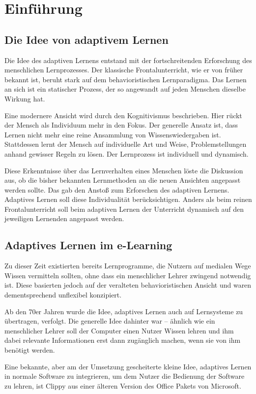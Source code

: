 \chapter{Einführung}

\section{Die Idee von adaptivem Lernen}
Die Idee des adaptiven Lernens entstand mit der fortschreitenden
Erforschung des menschlichen Lernprozesses.
Der klassische Frontalunterricht, wie er von früher bekannt ist,
beruht stark auf dem behavioristischen Lernparadigma.
Das Lernen an sich ist ein statischer Prozess, der so angewandt
auf jeden Menschen dieselbe Wirkung hat.

Eine modernere Ansicht wird durch den Kognitivismus
beschrieben. Hier rückt der Mensch als Individuum mehr in den Fokus.
Der generelle Ansatz ist, dass Lernen nicht mehr eine reine
Ansammlung von Wissenswiedergaben ist. Stattdessen lernt der Mensch
auf individuelle Art und Weise, Problemstellungen anhand gewisser Regeln zu lösen.
Der Lernprozess ist individuell und dynamisch.

Diese Erkenntnisse über das Lernverhalten eines Menschen löste die Diskussion aus,
ob die bisher bekannten Lernmethoden an die neuen Ansichten angepasst werden sollte.
Das gab den Anstoß zum Erforschen des adaptiven Lernens.
Adaptives Lernen soll diese Individualität berücksichtigen.
Anders als beim reinen Frontalunterricht soll beim adaptiven Lernen
der Unterricht dynamisch auf den jeweiligen Lernenden angepasst werden.

\section{Adaptives Lernen im e-Learning}
Zu dieser Zeit existierten bereits Lernprogramme, die Nutzern
auf medialen Wege Wissen vermitteln sollten, ohne dass ein menschlicher Lehrer
zwingend notwendig ist. Diese basierten jedoch auf der veralteten behavioristischen
Ansicht und waren dementsprechend unflexibel konzipiert.

Ab den 70er Jahren wurde die Idee, adaptives Lernen auch auf Lernsysteme
zu übertragen, verfolgt. Die generelle Idee dahinter war -- ähnlich wie ein
menschlicher Lehrer soll der Computer einen Nutzer Wissen lehren und
ihm dabei relevante Informationen erst dann zugänglich machen, wenn sie von ihm
benötigt werden.

Eine bekannte, aber am der Umsetzung gescheiterte kleine Idee, adaptives Lernen
in normale Software zu integrieren, um dem Nutzer die Bedienung der Software zu lehren,
ist \glqq Clippy\grqq{} aus einer älteren Version des Office Pakets von Microsoft.

